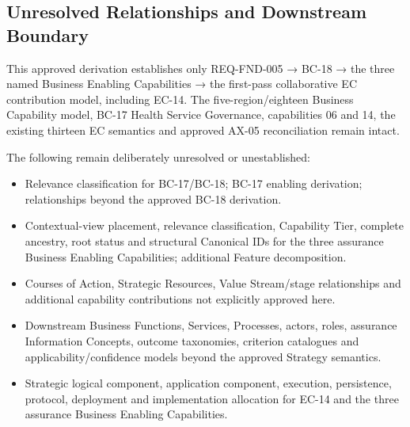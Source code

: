 \subsection*{Unresolved Relationships and Downstream Boundary}
\label{rad:assurance-strategy:90}

This approved derivation establishes only REQ-FND-005 → BC-18 → the three named Business Enabling Capabilities → the first-pass collaborative EC contribution model, including EC-14. The five-region/\allowbreak{}eighteen Business Capability model, BC-17 Health Service Governance, capabilities 06 and 14, the existing thirteen EC semantics and approved AX-05 reconciliation remain intact.

\label{rad:assurance-strategy:92}

The following remain deliberately unresolved or unestablished:

\label{rad:assurance-strategy:94}

\begin{itemize}

\item 
Relevance classification for BC-17/\allowbreak{}BC-18; BC-17 enabling derivation; relationships beyond the approved BC-18 derivation.



\item 
Contextual-view placement, relevance classification, Capability Tier, complete ancestry, root status and structural Canonical IDs for the three assurance Business Enabling Capabilities; additional Feature decomposition.



\item 
Courses of Action, Strategic Resources, Value Stream/\allowbreak{}stage relationships and additional capability contributions not explicitly approved here.



\item 
Downstream Business Functions, Services, Processes, actors, roles, assurance Information Concepts, outcome taxonomies, criterion catalogues and applicability/\allowbreak{}confidence models beyond the approved Strategy semantics.



\item 
Strategic logical component, application component, execution, persistence, protocol, deployment and implementation allocation for EC-14 and the three assurance Business Enabling Capabilities.



\end{itemize}
\label{rad:assurance-strategy:100}

